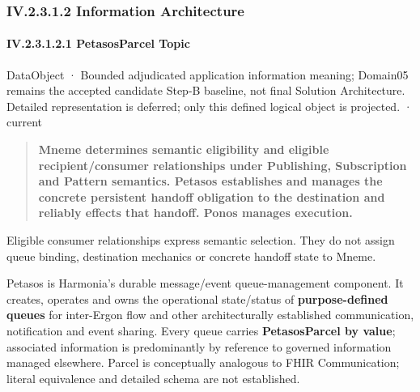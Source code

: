 \subsubsection*{IV.2.3.1.2 Information Architecture}
\label{navigation:IV.2.3.1.2}

\paragraph*{IV.2.3.1.2.1 PetasosParcel Topic}
\label{navigation:IV.2.3.1.2.1}

\label{element:f0a88f05a0cb438cb42572ec07fb8513}
{\small DataObject · Bounded adjudicated application information meaning; Domain05 remains the accepted candidate Step-B baseline, not final Solution Architecture. Detailed representation is deferred; only this defined logical object is projected. · current}\par

\begin{quote}


\textbf{Mneme determines semantic eligibility and eligible recipient/consumer
relationships under Publishing, Subscription and Pattern semantics. Petasos
establishes and manages the concrete persistent handoff obligation to the
destination and reliably effects that handoff. Ponos manages execution.}



\end{quote}


Eligible consumer relationships express semantic selection. They do not assign
queue binding, destination mechanics or concrete handoff state to Mneme.



Petasos is Harmonia's durable message/event queue-management component.
It creates, operates and owns the operational state/status of \textbf{purpose-defined
queues} for inter-Ergon flow and other architecturally established communication,
notification and event sharing. Every queue carries \textbf{PetasosParcel by value};
associated information is predominantly by reference to governed information
managed elsewhere. Parcel is conceptually analogous to FHIR Communication;
literal equivalence and detailed schema are not established.



